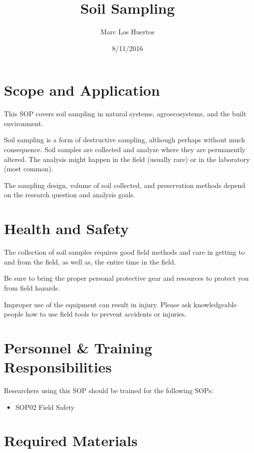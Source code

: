 \documentclass[12pt]{../SOP2}\usepackage[]{graphicx}\usepackage[]{xcolor}
\title{Soil Sampling}
\date{8/11/2016}
\author{Marc Los Huertos}
\begin{document}
\maketitle

\section{Scope and Application}

\NP This SOP covers soil sampling in natural systems, agroecosystems, and the built environment. 

\NP Soil sampling is a form of destructive sampling, although perhaps without much consequence. Soil samples are collected and analyze where they are permanently altered. The analysis might happen in the field (usually rare) or in the laboratory (most common). 

\NP The sampling design, volume of soil collected, and preservation methods depend on the research question and analysis goals.  

\section{Health and Safety}

\NP The collection of soil samples requires good field methods and care in getting to and from the field, as well as, the entire time in the field. 

\NP Be sure to bring the proper personal protective gear and resources to protect you from field hazards.

\NP Improper use of the equipment can result in injury. Please ask knowledgeable people how to use field tools to prevent accidents or injuries.


\section{Personnel \& Training Responsibilities}

\NP Researchers using this SOP should be trained for the following SOPs:

\begin{itemize}
  \item SOP02 Field Safety
\end{itemize}


\section{Required Materials}
\end{document}
